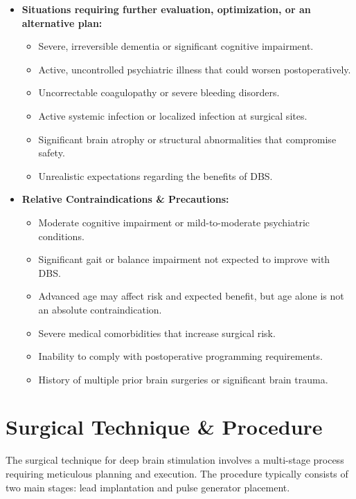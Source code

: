 \begin{itemize}
  \item \textbf{Situations requiring further evaluation, optimization, or an alternative plan:}
    \begin{itemize}
      \item Severe, irreversible dementia or significant cognitive impairment.
      \item Active, uncontrolled psychiatric illness that could worsen postoperatively.
      \item Uncorrectable coagulopathy or severe bleeding disorders.
      \item Active systemic infection or localized infection at surgical sites.
      \item Significant brain atrophy or structural abnormalities that compromise safety.
      \item Unrealistic expectations regarding the benefits of DBS.
    \end{itemize}
  \item \textbf{Relative Contraindications \& Precautions:}
    \begin{itemize}
      \item Moderate cognitive impairment or mild-to-moderate psychiatric conditions.
      \item Significant gait or balance impairment not expected to improve with DBS.
      \item Advanced age may affect risk and expected benefit, but age alone is not an absolute contraindication.
      \item Severe medical comorbidities that increase surgical risk.
      \item Inability to comply with postoperative programming requirements.
      \item History of multiple prior brain surgeries or significant brain trauma.
    \end{itemize}
\end{itemize}

\section*{Surgical Technique \& Procedure}
The surgical technique for deep brain stimulation involves a multi-stage process requiring meticulous planning and execution. The procedure typically consists of two main stages: lead implantation and pulse generator placement.

